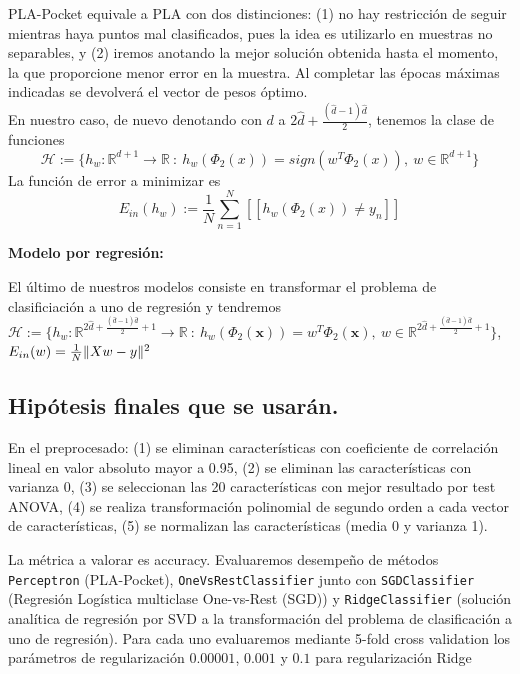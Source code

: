 \documentclass[11pt,a4paper]{article}
\DeclarePairedDelimiter{\norm}{\lVert}{\rVert}
\theoremstyle{definition}
\newcommand{\R}{\mathbb{R}}
\begin{document}
	PLA-Pocket equivale a PLA con dos distinciones: (1) no hay restricción de seguir mientras haya puntos mal clasificados, pues la idea es utilizarlo en muestras no separables, y (2) iremos anotando la mejor solución obtenida hasta el momento, la que proporcione menor error en la muestra. Al completar las épocas máximas indicadas se devolverá el vector de pesos óptimo.\\
	En nuestro caso, de nuevo denotando con $d$ a $2\hat d + \frac{(\hat d -1)\hat d}{2}$, tenemos la clase de funciones
	$$\mathcal{H}:=\{h_w\colon \R^{d+1} \to \R \ : \ h_w(\Phi_2(x)) = sign(w^T\Phi_2(x)), \ w \in \R^{d+1}\}$$
	La función de error a minimizar es 
	$$E_{in}(h_w):= \frac{1}{N} \sum_{n=1}^N [[h_w(\Phi_2(x))\neq y_n]]$$
	
	\textbf{Modelo por regresión:}
	
	El último de nuestros modelos consiste en transformar el problema de clasificiación a uno de regresión y tendremos $\mathcal{H}:=\{h_w\colon \R^{2\hat d + \frac{(\hat d -1)\hat d}{2}+1}\to \R \ : \ h_w(\Phi_2(\mathbf{x}))=w^T\Phi_2(\mathbf{x}), \ w\in \R^{2\hat d + \frac{(\hat d -1)\hat d}{2}+1}\}$, $E_{in}(w)=\frac{1}{N}\norm{Xw-y}^2$
	
	\subsection{Hipótesis finales que se usarán.}
	En el preprocesado: (1) se eliminan características con coeficiente de correlación lineal en valor absoluto mayor a 0.95, (2) se eliminan las características con varianza 0, (3) se seleccionan las 20 características con mejor resultado por test ANOVA, (4) se realiza transformación polinomial de segundo orden a cada vector de características, (5) se normalizan las características (media 0 y varianza 1).
	
	La métrica a valorar es accuracy. Evaluaremos desempeño de métodos \texttt{Perceptron} (PLA-Pocket), \texttt{OneVsRestClassifier} junto con \texttt{SGDClassifier} (Regresión Logística multiclase One-vs-Rest (SGD)) y \texttt{RidgeClassifier} (solución analítica de regresión por SVD a la transformación del problema de clasificación a uno de regresión). Para cada uno evaluaremos mediante 5-fold cross validation los parámetros de regularización $0.00001$, $0.001$ y $0.1$ para regularización Ridge
\end{document}
